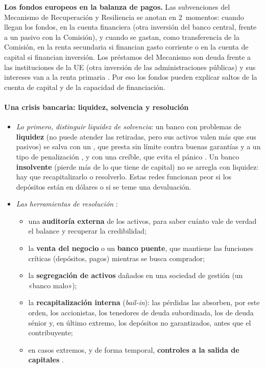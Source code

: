 \documentclass[11pt]{article}
\begin{document}
\begin{anotaciones}
\textbf{Los fondos europeos en la balanza de pagos.} Las subvenciones del Mecanismo de Recuperación y Resiliencia se anotan en 2~momentos: cuando llegan los fondos, en la cuenta financiera (otra inversión del banco central, frente a un pasivo con la Comisión), y cuando se gastan, como transferencia de la Comisión, en la renta secundaria si financian gasto corriente o en la cuenta de capital si financian inversión. Los préstamos del Mecanismo son deuda frente a las instituciones de la UE (otra inversión de las administraciones públicas) y sus intereses van a la renta primaria \parencite{BdE2021NGEU}. Por eso los fondos pueden explicar saltos de la cuenta de capital y de la capacidad de financiación.
\end{anotaciones}

\paragraph{Una crisis bancaria: liquidez, solvencia y resolución}
\begin{itemize}
\item \emph{Lo primero, distinguir liquidez de solvencia}: un banco con problemas de \textbf{liquidez} (no puede atender las retiradas, pero sus activos valen más que sus pasivos) se salva con un , que presta sin límite contra buenas garantías y a un tipo de penalización \parencite{Bagehot1873}, y con una  creíble, que evita el pánico \parencite{DiamondDybvig1983}. Un banco \textbf{insolvente} (pierde más de lo que tiene de capital) no se arregla con liquidez: hay que recapitalizarlo o resolverlo. Estas redes funcionan peor si los depósitos están en dólares o si se teme una devaluación.
\item \emph{Las herramientas de resolución} \parencite{DirUE2014BRRD}:
  \begin{itemize}
  \item una \textbf{auditoría externa} de los activos, para saber cuánto vale de verdad el balance y recuperar la credibilidad;
  \item la \textbf{venta del negocio} o un \textbf{banco puente}, que mantiene las funciones críticas (depósitos, pagos) mientras se busca comprador;
  \item la \textbf{segregación de activos} dañados en una sociedad de gestión (un «banco malo»);
  \item la \textbf{recapitalización interna} (\emph{bail-in}): las pérdidas las absorben, por este orden, los accionistas, los tenedores de deuda subordinada, los de deuda sénior y, en último extremo, los depósitos no garantizados, antes que el contribuyente;
  \item en casos extremos, y de forma temporal, \textbf{controles a la salida de capitales} \parencite{FMI2012VisionInstitucional}.
  \end{itemize}
\end{itemize}
\end{document}
